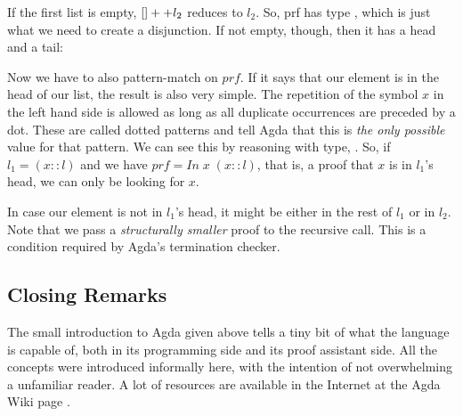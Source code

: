 
If the first list is empty, $[] ++ l_2$ reduces to $l_2$. So, prf has type , which
is just what we need to create a disjunction. If not empty, though, then it has a head and a tail:


 Now we have to also pattern-match
on $prf$. If it says that our element is in the head of our list, the result is also very simple.
The repetition of the symbol $x$ in the left hand side is allowed as long as all duplicate occurrences
are preceded by a dot. These are called dotted patterns and tell Agda that this is \emph{the only possible}
value for that pattern. We can see this by reasoning with  type, . 
So, if $l_1 = (x :: l)$ and we have $prf = In\; x\; (x :: l)$, that is, a proof that $x$ is in $l_1$'s head,
we can only be looking for $x$. 


In case our element is not in $l_1$'s head, it might be either in the rest of $l_1$ or in $l_2$.
Note that we pass a \emph{structurally smaller} proof to the recursive call. This is a condition required by
Agda's termination checker.

\subsection{Closing Remarks}

The small introduction to Agda given above tells a tiny bit of what the language is capable of,
both in its programming side and its proof assistant side. All the concepts were introduced
informally here, with the intention of not overwhelming a unfamiliar reader. A lot of resources
are available in the Internet at the Agda Wiki page \cite{AgdaTutorials}. 



